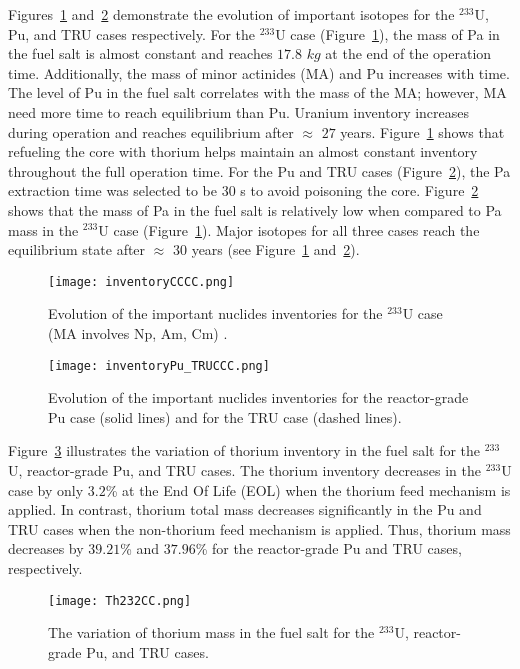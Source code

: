 Figures~\ref{fig:inventoryCCCC} and~\ref{fig:inventoryPu_TRUCCC} demonstrate 
the evolution of important isotopes for the $^{233}$U, Pu, and TRU cases 
respectively. For the $^{233}$U case (Figure~\ref{fig:inventoryCCCC}), the mass of Pa in the fuel salt is almost constant and reaches 
$17.8$  $kg$ at the end of the operation time. 
Additionally, the mass of minor actinides (MA) and Pu increases with time. The level of Pu in the fuel salt correlates with the mass of the MA; however, MA need more time to reach equilibrium than Pu. Uranium inventory increases during 
operation and reaches equilibrium after $\approx$ $27$ years. Figure~\ref{fig:inventoryCCCC} shows that refueling the core with thorium helps 
maintain an almost constant inventory throughout the full operation time. 
For the Pu and TRU cases (Figure~\ref{fig:inventoryPu_TRUCCC}), the Pa extraction time was selected to be 30 s 
to avoid poisoning the core. Figure~\ref{fig:inventoryPu_TRUCCC} shows that the mass of Pa in the fuel salt 
is relatively low when compared to Pa mass in the $^{233}$U case (Figure~\ref{fig:inventoryCCCC}). Major 
isotopes for all three cases reach the equilibrium state after $\approx$ $30$ 
years (see Figure~\ref{fig:inventoryCCCC} and~\ref{fig:inventoryPu_TRUCCC}).
\begin{figure}
	\centering
	\texttt{[image: inventoryCCCC.png]}
	\vspace{-0.4in}
	\caption{Evolution of the important nuclides inventories for the $^{233}$U 
		case (MA involves Np, Am, Cm) \cite{ashraf2019whole_core}.}
	\label{fig:inventoryCCCC}
\end{figure}
\begin{figure}
	\centering
	\texttt{[image: inventoryPu\_TRUCCC.png]}
	\vspace{-0.5in}
	\caption{Evolution of the important nuclides inventories for the 
		reactor-grade Pu case (solid lines) and for the TRU case (dashed lines).}
	\label{fig:inventoryPu_TRUCCC}
\end{figure}

Figure~\ref{fig:Th232CC} illustrates the variation of thorium inventory in the 
fuel salt for the $^{233}$U, reactor-grade Pu, and TRU cases. The thorium inventory 
decreases in the $^{233}$U case by only $3.2$\% at the End Of Life (EOL) when the thorium 
feed mechanism is applied. 
In contrast, thorium total mass decreases significantly in the Pu and TRU cases when the non-thorium 
feed mechanism is applied. Thus, thorium mass decreases by $39.21$\% and 
$37.96$\% for the reactor-grade Pu and TRU cases, respectively.
\begin{figure}
	\centering
	\texttt{[image: Th232CC.png]}
	\caption{The variation of thorium mass in the fuel salt for the $^{233}$U, reactor-grade Pu, and TRU cases.}
	\label{fig:Th232CC}
\end{figure}

